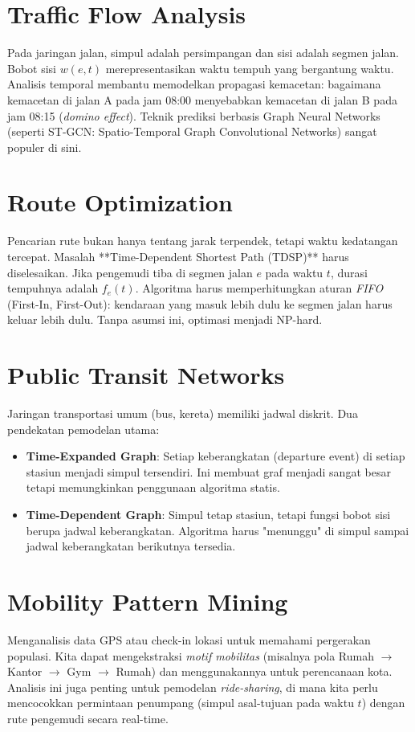 \documentclass[12pt,a4paper]{book}
\begin{document}
\section{Traffic Flow Analysis}
Pada jaringan jalan, simpul adalah persimpangan dan sisi adalah segmen jalan. Bobot sisi $w(e, t)$ merepresentasikan waktu tempuh yang bergantung waktu.
Analisis temporal membantu memodelkan propagasi kemacetan: bagaimana kemacetan di jalan A pada jam 08:00 menyebabkan kemacetan di jalan B pada jam 08:15 (\textit{domino effect}). Teknik prediksi berbasis Graph Neural Networks (seperti ST-GCN: Spatio-Temporal Graph Convolutional Networks) sangat populer di sini.

\section{Route Optimization}
Pencarian rute bukan hanya tentang jarak terpendek, tetapi waktu kedatangan tercepat.
Masalah **Time-Dependent Shortest Path (TDSP)** harus diselesaikan. Jika pengemudi tiba di segmen jalan $e$ pada waktu $t$, durasi tempuhnya adalah $f_e(t)$.
Algoritma harus memperhitungkan aturan \textit{FIFO} (First-In, First-Out): kendaraan yang masuk lebih dulu ke segmen jalan harus keluar lebih dulu. Tanpa asumsi ini, optimasi menjadi NP-hard.

\section{Public Transit Networks}
Jaringan transportasi umum (bus, kereta) memiliki jadwal diskrit.
Dua pendekatan pemodelan utama:
\begin{itemize}
    \item \textbf{Time-Expanded Graph}: Setiap keberangkatan (departure event) di setiap stasiun menjadi simpul tersendiri. Ini membuat graf menjadi sangat besar tetapi memungkinkan penggunaan algoritma statis.
    \item \textbf{Time-Dependent Graph}: Simpul tetap stasiun, tetapi fungsi bobot sisi berupa jadwal keberangkatan. Algoritma harus "menunggu" di simpul sampai jadwal keberangkatan berikutnya tersedia.
\end{itemize}

\section{Mobility Pattern Mining}
Menganalisis data GPS atau check-in lokasi untuk memahami pergerakan populasi.
Kita dapat mengekstraksi \textit{motif mobilitas} (misalnya pola Rumah $\to$ Kantor $\to$ Gym $\to$ Rumah) dan menggunakannya untuk perencanaan kota. Analisis ini juga penting untuk pemodelan \textit{ride-sharing}, di mana kita perlu mencocokkan permintaan penumpang (simpul asal-tujuan pada waktu $t$) dengan rute pengemudi secara real-time.
\end{document}
